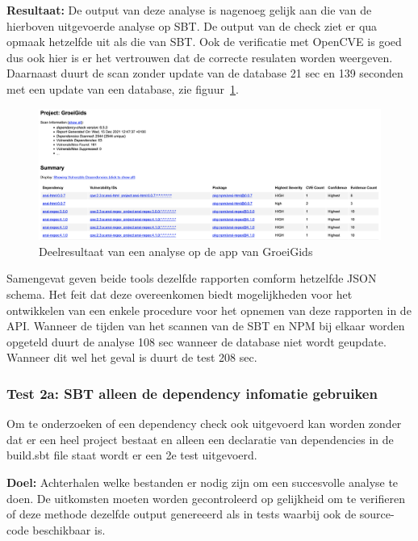 \begin{itemize}
    \textbf{Resultaat:} De output van deze analyse is nagenoeg gelijk aan die van de hierboven uitgevoerde analyse op SBT. De output van de check ziet er qua opmaak hetzelfde uit als die van SBT. Ook de verificatie met OpenCVE is goed dus ook hier is er het vertrouwen dat de correcte resulaten worden weergeven. Daarnaast duurt de scan zonder update van de database 21 sec en 139 seconden met een update van een database, zie figuur~\ref{fig:NPMReport1b}.

    \begin{figure}
        \myfloatalign
        \includegraphics[width=15cm]{gfx/report_analyse_test1b_NPM}
        \caption{Deelresultaat van een analyse op de app van GroeiGids}
        \label{fig:NPMReport1b}
    \end{figure}

    Samengevat geven beide tools dezelfde rapporten comform hetzelfde JSON schema. Het feit dat deze overeenkomen biedt mogelijkheden voor het ontwikkelen van een enkele procedure voor het opnemen van deze rapporten in de API.
    Wanneer de tijden van het scannen van de SBT en NPM bij elkaar worden opgeteld duurt de analyse 108 sec wanneer de database niet wordt geupdate. Wanneer dit wel het geval is duurt de test 208 sec.

    \subsubsection{Test 2a: SBT alleen de dependency infomatie gebruiken}
    Om te onderzoeken of een dependency check ook uitgevoerd kan worden zonder dat er een heel project bestaat en alleen een declaratie van dependencies in de build.sbt file staat wordt er een 2e test uitgevoerd.

    \textbf{Doel:} Achterhalen welke bestanden er nodig zijn om een succesvolle analyse te doen. De uitkomsten moeten worden gecontroleerd op gelijkheid om te verifieren of deze methode dezelfde output genereeerd als in tests waarbij ook de source-code beschikbaar is.


\end{itemize}
